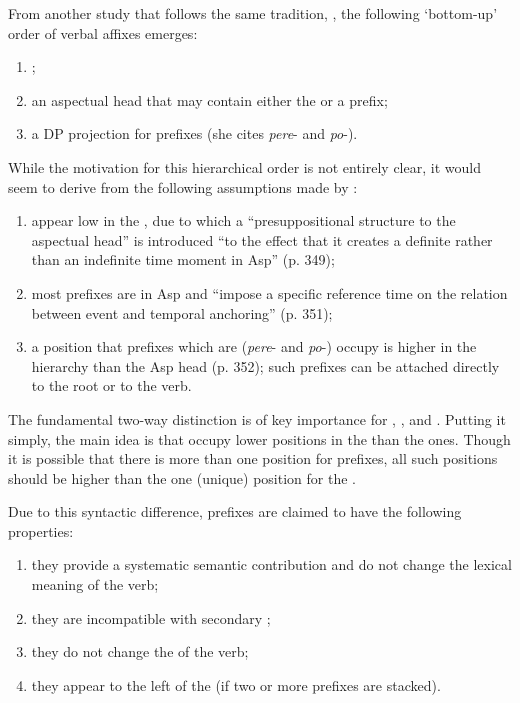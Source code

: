 From another study that follows the same tradition, \citealt{Ramchand:04}, the following `bottom-up' order of verbal affixes emerges:

\begin{enumerate}
\item {};
\item an aspectual head that may contain either the  or a  prefix;
\item a DP projection for   prefixes (she cites \textit{pere}- and \textit{po}-). 
\end{enumerate}
While the motivation for this hierarchical order is not entirely clear, it would seem to derive from the following assumptions made by \citet{Ramchand:04}: 
\begin{enumerate}
\item {} appear low in the , due to which a ``presuppositional structure to the aspectual head'' is introduced ``to the effect that it creates a definite rather than an indefinite time moment in Asp'' (p. 349);
\item most  prefixes are in Asp and ``impose a specific reference time on the relation between event and temporal anchoring'' (p. 351);
\item a position that  prefixes which are  (\textit{pere}- and  \textit{po}-) occupy is higher in the hierarchy than the Asp head (p. 352); such prefixes can be attached directly to the root or to the  verb.
\end{enumerate}
The fundamental two-way distinction is of key importance for \citet{Romanova:04}, \citet{Svenonius:04b}, and \citet{Ramchand:04}. Putting it simply, the main idea is that  occupy lower positions in the  than the  ones. Though it is possible that there is more than one position for  prefixes, all such positions should be higher than the one (unique) position for the . 

Due to this syntactic difference,  prefixes are claimed to have the following properties:
\begin{enumerate}
\item they provide a systematic semantic contribution and do not change the lexical meaning of the verb;
\item they are incompatible with secondary ;
\item they do not change the  of the verb;
\item they appear to the left of the  (if two or more prefixes are stacked). 
\end{enumerate}

